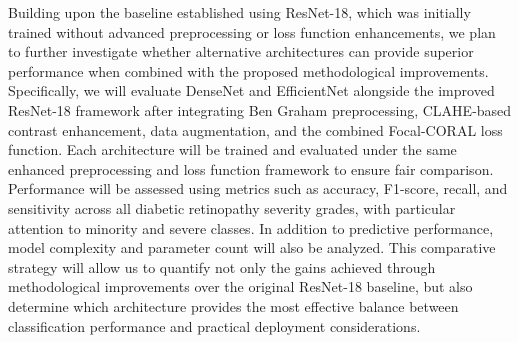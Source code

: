 Building upon the baseline established using ResNet-18, which was initially trained without advanced preprocessing or 
loss function enhancements, we plan to further investigate whether alternative architectures can provide superior performance 
when combined with the proposed methodological improvements. Specifically, we will evaluate DenseNet and EfficientNet alongside 
the improved ResNet-18 framework after integrating Ben Graham preprocessing, CLAHE-based contrast enhancement, data augmentation, 
and the combined Focal-CORAL loss function. Each architecture will be trained and evaluated under the same enhanced preprocessing 
and loss function framework to ensure fair comparison. Performance will be assessed using metrics such as accuracy, F1-score, 
recall, and sensitivity across all diabetic retinopathy severity grades, with particular attention to minority and severe classes. 
In addition to predictive performance, model complexity and parameter count will also be analyzed. This comparative strategy will allow 
us to quantify not only the gains achieved through methodological improvements over the original ResNet-18 baseline, but also determine 
which architecture provides the most effective balance between classification performance and practical deployment considerations.
